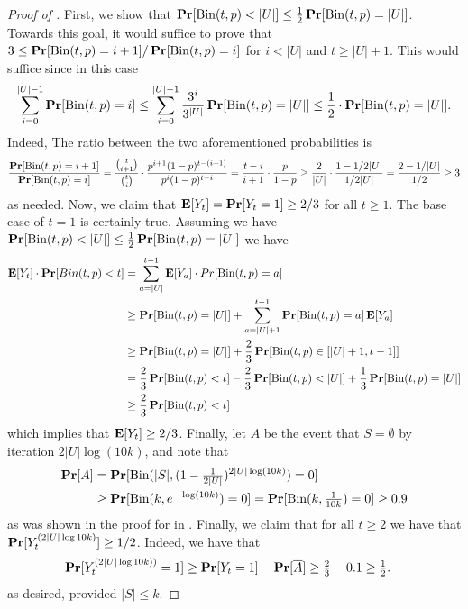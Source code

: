 \documentclass[10pt,a4paper]{article}
\theoremstyle{plain}
\theoremstyle{remark}
\theoremstyle{plain}
\renewcommand{\Pr}{\mathop{\bf Pr\/}}
\providecommand{\E}{}
\renewcommand{\E}{\mathop{\bf E\/}}
\newcommand{\Binomial}{\textrm{Bin}}
\begin{document}
\begin{proof}[Proof of ]
First, we show that  $\Pr[\Binomial(t,p)<|U|] \le \frac{1}{2} \Pr[\Binomial(t,p)=|U|]$.
Towards this goal, it would suffice to prove
that $3\le \Pr[\Binomial(t,p)=i+1]/\Pr[\Binomial(t,p)=i]$ for $i<|U|$ and $t\ge|U|+1$. 
This would suffice since in this case $$\sum_{i=0}^{|U|-1} \Pr[\Binomial(t,p)=i] \le \sum_{i=0}^{|U|-1} \frac{3^{i}}{3^{|U|}} \Pr[\Binomial(t,p)=|U|] \le \frac{1}{2} \cdot \Pr[\Binomial(t,p)=|U|].$$
Indeed, The ratio between the two aforementioned probabilities is 
$$
\frac{\Pr[\Binomial(t,p)=i+1]}{\Pr[\Binomial(t,p)=i]} = \frac{\binom{t}{i+1}}{\binom{t}{i}} \cdot  \frac{p^{i+1}(1-p)^{t-(i+1)}}{p^{i}(1-p)^{t-i}} = 
\frac{t-i}{i+1} \cdot \frac{p}{1-p} \ge \frac{2}{|U|}\cdot \frac{1-1/2|U|}{1/2|U|} =\frac{2-1/|U|}{1/2}\ge 3
$$
as needed.
Now, we claim that $\E[Y_t] = \Pr[Y_t = 1] \geq 2/3$ for all $t \geq 1$. The base case of $t=1$ is certainly true. Assuming we have $\Pr[\Binomial(t,p)<|U|] \le \tfrac{1}{2}\Pr[\Binomial(t,p)=|U|]$ we have 
\begin{align*}
	\E[Y_t]\cdot \Pr[ Bin(t,p)<t] &=  
    \sum_{a=|U|}^{t-1} \E[Y_a] \cdot Pr[\Binomial(t,p)=a]\\
    &\ge \Pr[\Binomial(t,p)=|U|] + 
    \sum_{a=|U|+1}^{t-1} \Pr[\Binomial(t,p)=a]\E[Y_a]\\
    &\geq \Pr[\Binomial(t,p) = |U|] + \frac{2}{3}\Pr[\Binomial(t,p) \in [|U|+1,t-1]] \\
    &= \frac{2}{3} \Pr[\Binomial(t,p) <t] - \frac{2}{3}\Pr[\Binomial(t,p)<|U|] + \frac{1}{3}\Pr[\Binomial(t,p)=|U|]\\
    &\ge \frac{2}{3}\Pr[\Binomial(t,p)<t] 
\end{align*}
which implies that $\E[Y_t] \geq 2/3$. Finally, let $A$ be the event that $S = \emptyset$ by iteration $2|U|\log(10k)$, and note that 
\begin{align*}
\Pr[A] &= \Pr[\Binomial(|S|, (1-\tfrac{1}{2|U|})^{2|U|\log(10k)} )= 0] \\
%
&\geq \Pr[\Binomial(k, e^{-\log (10k)}) = 0]  = \Pr[\Binomial(k, \tfrac{1}{10k}) = 0] \geq 0.9
\end{align*}
as was shown in the proof for  in . Finally, we claim that for all $t\geq 2$ we have that $\Pr[Y_t^{(2|U|\log 10k)}]\geq 1/2$. Indeed, we have that
\begin{align*}
    \Pr[Y_t^{(2|U|\log 10k))} = 1] &\geq \Pr[Y_t=1] -\Pr[\overline{A}] \ge \tfrac{2}{3}-0.1    \geq \tfrac{1}{2}.
\end{align*}
as desired, provided $|S|\leq k$.
\end{proof}
\end{document}
